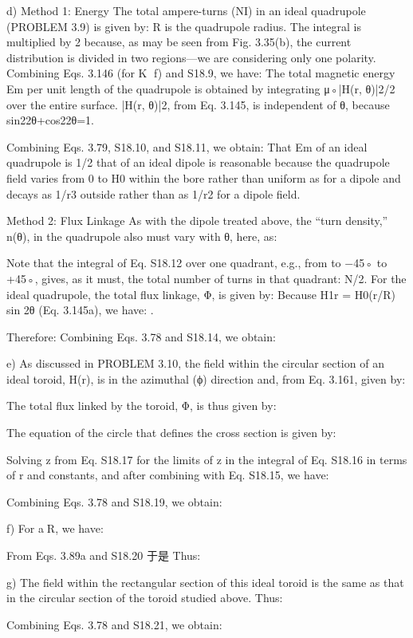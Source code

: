 d) Method 1: Energy The total ampere-turns (NI) in an ideal quadrupole
(PROBLEM 3.9) is given by:
R is the quadrupole radius. The integral is multiplied by 2 because, as may be
seen from Fig. 3.35(b), the current distribution is divided in two regions—we are
considering only one polarity. Combining Eqs. 3.146 (for K f) and S18.9, we have:
The total magnetic energy Em per unit length of the quadrupole is obtained by
integrating μ◦|H(r, θ)|2/2 over the entire surface. |H(r, θ)|2, from Eq. 3.145, is
independent of θ, because sin22θ+cos22θ=1.

Combining Eqs. 3.79, S18.10, and S18.11, we obtain:
That Em of an ideal quadrupole is 1/2 that of an ideal dipole is reasonable because
the quadrupole field varies from 0 to H0 within the bore rather than uniform as
for a dipole and decays as 1/r3 outside rather than as 1/r2 for a dipole field.

Method 2: Flux Linkage As with the dipole treated above, the “turn density,”
n(θ), in the quadrupole also must vary with θ, here, as:

Note that the integral of Eq. S18.12 over one quadrant, e.g., from to −45◦ to
+45◦, gives, as it must, the total number of turns in that quadrant: N/2. For the
ideal quadrupole, the total flux linkage, Φ, is given by:
Because H1r = H0(r/R) sin 2θ (Eq. 3.145a), we have:
.%

Therefore:
Combining Eqs. 3.78 and S18.14, we obtain:

e) As discussed in PROBLEM 3.10, the field within the circular section of an
ideal toroid, H(r), is in the azimuthal (ϕ) direction and, from Eq. 3.161, given by:


The total flux linked by the toroid, Φ, is thus given by:

The equation of the circle that defines the cross section is given by:

Solving z from Eq. S18.17 for the limits of z in the integral of Eq. S18.16 in terms
of r and constants, and after combining with Eq. S18.15, we have:

Combining Eqs. 3.78 and S18.19, we obtain:

f) For aR, we have:

From Eqs. 3.89a and S18.20
于是
Thus:

g) The field within the rectangular section of this ideal toroid is the same as that
in the circular section of the toroid studied above. Thus:

Combining Eqs. 3.78 and S18.21, we obtain:

